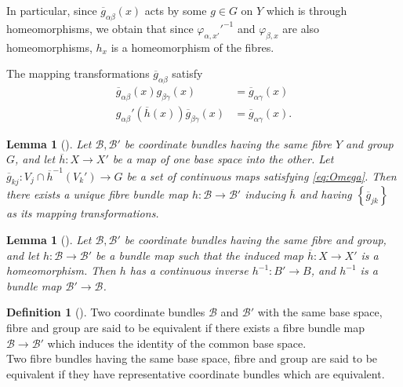\documentclass[reqno]{amsart}
\newtheorem{lemma}[theorem]{Lemma}
\theoremstyle{definition}
\newtheorem{definition}[theorem]{Definition}
\theoremstyle{remark}
\begin{document}
In particular, since
$\overline{g}_{\alpha \beta}(x)$ acts by
some $g \in G$ on $Y$ which is through homeomorphisms,
we obtain that since
$\varphi_{\alpha,x'}'^{-1}$ and
$\varphi_{\beta, x}$ are also homeomorphisms,
$h_x$ is a homeomorphism of the fibres.

The mapping transformations $\overline{g}_{\alpha \beta}$ satisfy
\begin{align*} \label{eq:Omega}\tag{$\Omega$}
    \overline{g}_{\alpha \beta}(x) g_{\beta \gamma}(x)
    &= \overline{g}_{\alpha \gamma}(x)\\
    g_{\alpha \beta}' \left( \overline{h}(x) \right) 
    \overline{g}_{\beta \gamma}(x) &= \overline{g}_{\alpha \gamma}
    (x).
\end{align*}

\begin{lemma}[]
    Let $\mathcal{B}, \mathcal{B}'$ be coordinate bundles having
    the same fibre $Y$ and group  $G$, and let
    $\overline{h} \colon X \to X'$ be a map of one
    base space into the other. Let
    $\overline{g}_{kj} \colon
    V_j \cap \overline{h}^{-1}(V_k') \to G$ be a set
    of continuous maps satisfying \eqref{eq:Omega}. Then
    there exists a unique fibre bundle map
    $h \colon \mathcal{B} \to \mathcal{B}'$ inducing
    $\overline{h}$ and having
    $\left\{ \overline{g}_{jk} \right\} $ as its
    mapping transformations.
\end{lemma}

\begin{lemma}[]
    Let $\mathcal{B}, \mathcal{B}'$ be coordinate bundles having
    the same fibre and group, and let $h \colon \mathcal{B}
    \to \mathcal{B}'$ be a bundle map such that
    the induced map $\overline{h} \colon X \to X'$ is
    a homeomorphism. Then
    $h$ has a continuous inverse
    $h^{-1} \colon B' \to B$, and
    $h^{-1}$ is a bundle map
    $\mathcal{B}' \to \mathcal{B}$.
\end{lemma}


\begin{definition}[]
    Two coordinate bundles 
    $\mathcal{B}$ and $\mathcal{B}'$ with the same
    base space, fibre and group are said to be
    equivalent if there exists a fibre bundle
    map $\mathcal{B}\to \mathcal{B}'$ which induces the
    identity of the common base space.\\
    Two fibre bundles having the same base space,
    fibre and group are said to be equivalent if they
    have representative coordinate bundles which are
    equivalent.
\end{definition}
\end{document}
